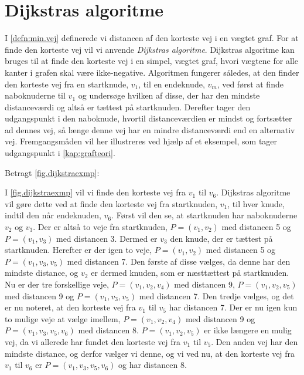 \section{Dijkstras algoritme} \label{kap:dijkstras}
I \autoref{defn:min.vej} definerede vi distancen af den korteste vej i en vægtet graf. For at finde den korteste vej vil vi anvende \emph{Dijkstras algoritme}. Dijkstras algoritme kan bruges til at finde den korteste vej i en simpel, vægtet graf, hvori vægtene for alle kanter i grafen skal være ikke-negative. Algoritmen fungerer således, at den finder den korteste vej fra en startknude, $v_{1}$, til en endeknude, $v_{m}$, ved først at finde naboknuderne til $v_{1}$ og undersøge hvilken af disse, der har den mindste distanceværdi og altså er tættest på startknuden. Derefter tager den udgangspunkt i den naboknude, hvortil distanceværdien er mindst og fortsætter ad dennes vej, så længe denne vej har en mindre distanceværdi end en alternativ vej. Fremgangsmåden vil her illustreres ved hjælp af et eksempel, som tager udgangspunkt i \autoref{kap:grafteori}.

\begin{exmp} \label{exmp.dijkstae}
Betragt \autoref{fig.dijkstraexmp}:

I \autoref{fig.dijkstraexmp} vil vi finde den korteste vej fra $v_{1}$ til $v_{6}$. Dijkstras algoritme vil gøre dette ved at finde den korteste vej fra startknuden, $v_{1}$, til hver knude, indtil den når endeknuden, $v_{6}$. Først vil den se, at startknuden har naboknuderne $v_{2}$ og $v_{3}$. Der er altså to veje fra startknuden, $P=(v_{1},v_{2})$ med distancen 5 og $P=(v_{1},v_{3})$ med distancen 3. Dermed er $v_{3}$ den knude, der er tættest på startknuden. Herefter er der igen to veje, $P=(v_{1},v_{2})$ med distancen 5 og $P=(v_{1},v_{3},v_{5})$ med distancen 7. Den første af disse vælges, da denne har den mindste distance, og $v_{2}$ er dermed knuden, som er næsttættest på startknuden. Nu er der tre forskellige veje, $P=(v_{1},v_{2}, v_{4})$ med distancen 9, $P=(v_{1},v_{2}, v_{5})$ med distancen 9 og $P=(v_{1},v_{3}, v_{5})$ med distancen 7. Den tredje vælges, og det er nu noteret, at den korteste vej fra $v_{1}$ til $v_{5}$ har distancen 7. Der er nu igen kun to mulige veje at vælge imellem, $P=(v_{1},v_{2}, v_{4})$ med distancen 9 og $P=(v_{1},v_{3}, v_{5}, v_{6})$ med distancen 8. $P=(v_{1},v_{2}, v_{5})$ er ikke længere en mulig vej, da vi allerede har fundet den korteste vej fra $v_{1}$ til $v_{5}$. Den anden vej har den mindste distance, og derfor vælger vi denne, og vi ved nu, at den korteste vej fra $v_{1}$ til $v_{6}$ er $P=(v_{1},v_{3}, v_{5}, v_{6})$ og har distancen 8.
\end{exmp}

